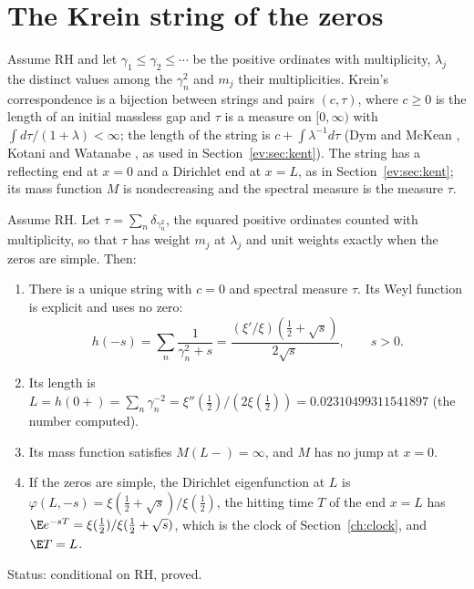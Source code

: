 \section{The Krein string of the zeros}\label{bk:sec:string}

Assume RH and let $\gamma_1\le\gamma_2\le\cdots$ be the positive ordinates with multiplicity, $\lambda_j$ the distinct values among the $\gamma_n^2$ and $m_j$ their multiplicities. Krein's correspondence is a bijection between strings and pairs $(c,\tau)$, where $c\ge0$ is the length of an initial massless gap and $\tau$ is a measure on $[0,\infty)$ with $\int d\tau/(1+\lambda)<\infty$; the length of the string is $c+\int\lambda^{-1}d\tau$ (Dym and McKean \cite{DymMcKean76}, Kotani and Watanabe \cite{KotaniWatanabe82}, as used in Section~\ref{ev:sec:kent}). The string has a reflecting end at $x=0$ and a Dirichlet end at $x=L$, as in Section~\ref{ev:sec:kent}; its mass function $M$ is nondecreasing and the spectral measure is the measure $\tau$.

\begin{theorem}[conditional on RH]\label{bk:thm:string}
Assume RH. Let $\tau=\sum_n\delta_{\gamma_n^2}$, the squared positive ordinates counted with multiplicity, so that $\tau$ has weight $m_j$ at $\lambda_j$ and unit weights exactly when the zeros are simple. Then:
\begin{enumerate}
\item[(a)] There is a unique string with $c=0$ and spectral measure $\tau$. Its Weyl function is explicit and uses no zero:
\[
h(-s)=\sum_n\frac1{\gamma_n^2+s}=\frac{(\xi'/\xi)(\frac12+\sqrt s)}{2\sqrt s},\qquad s>0.
\]
\item[(b)] Its length is $L=h(0+)=\sum_n\gamma_n^{-2}=\xi''(\frac12)/(2\xi(\frac12))=0.02310499311541897$ (the number computed).
\item[(c)] Its mass function satisfies $M(L-)=\infty$, and $M$ has no jump at $x=0$.
\item[(d)] If the zeros are simple, the Dirichlet eigenfunction at $L$ is $\varphi(L,-s)=\xi(\frac12+\sqrt s)/\xi(\frac12)$, the hitting time $T$ of the end $x=L$ has $\E e^{-sT}=\xi(\frac12)/\xi(\frac12+\sqrt s)$, which is the clock of Section~\ref{ch:clock}, and $\E T=L$.
\end{enumerate}
Status: conditional on RH, proved.
\end{theorem}

